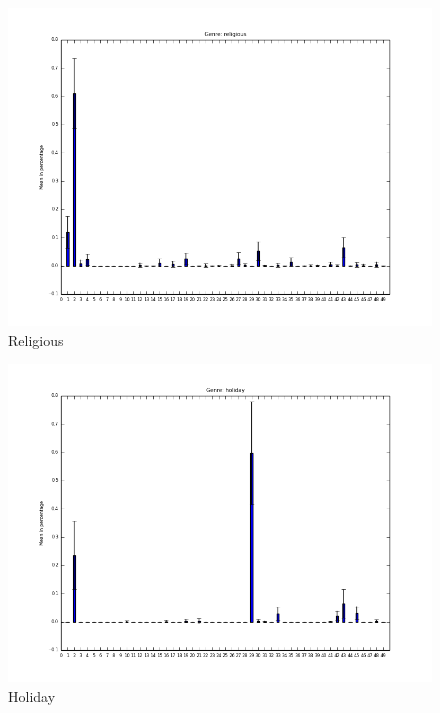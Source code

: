 \documentclass[t,ignorenonframetext]{beamer}
\begin{document}
\begin{frame}
\begin{minipage}[b][.35\textheight][t]{.47\textwidth}
\begin{figure}
\includegraphics[scale=0.2]{bar_charts/religious}
\caption{Religious}
\end{figure}
\end{minipage}\hfill%
    \begin{minipage}[b][.35\textheight][t]{.47\textwidth}
    \begin{figure}
\includegraphics[scale=0.2]{bar_charts/holiday}
\caption{Holiday}
\end{figure}
\end{minipage}\\[3em]


\end{frame}
\end{document}
